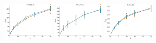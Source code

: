 \documentclass[a4paper]{report}
\newcommand{\wratio}{0.19}
\begin{document}
\vfill
\includegraphics[width=\wratio\textwidth]{maxcut/PROTEIN/fs_protein}\hfill
\includegraphics[width=\wratio\textwidth]{maxcut/SNAP_GR/fs_snap_gr}\hfill
\includegraphics[width=\wratio\textwidth]{maxcut/STELZL/fs_stelzl}\hfill
\clearpage
\end{document}
